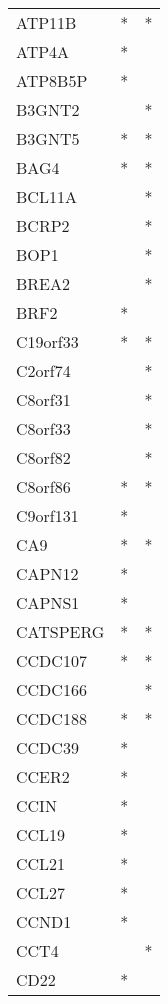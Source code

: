 \begin{longtable}{lcc}
ATP11B       &         * &       * \\
ATP4A        &         * &         \\
ATP8B5P      &         * &         \\
B3GNT2       &           &       * \\
B3GNT5       &         * &       * \\
BAG4         &         * &       * \\
BCL11A       &           &       * \\
BCRP2        &           &       * \\
BOP1         &           &       * \\
BREA2        &           &       * \\
BRF2         &         * &         \\
C19orf33     &         * &       * \\
C2orf74      &           &       * \\
C8orf31      &           &       * \\
C8orf33      &           &       * \\
C8orf82      &           &       * \\
C8orf86      &         * &       * \\
C9orf131     &         * &         \\
CA9          &         * &       * \\
CAPN12       &         * &         \\
CAPNS1       &         * &         \\
CATSPERG     &         * &       * \\
CCDC107      &         * &       * \\
CCDC166      &           &       * \\
CCDC188      &         * &       * \\
CCDC39       &         * &         \\
CCER2        &         * &         \\
CCIN         &         * &         \\
CCL19        &         * &         \\
CCL21        &         * &         \\
CCL27        &         * &         \\
CCND1        &         * &         \\
CCT4         &           &       * \\
CD22         &         * &         \\

\end{longtable}
